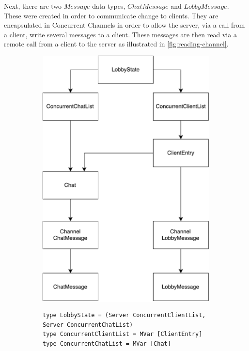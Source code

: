 \documentclass[a4paper]{article}
\begin{document}
Next, there are two $Message$ data types, $ChatMessage$ and $LobbyMessage$. These were created in order to communicate change to clients. They are encapsulated in Concurrent Channels in order to allow the server, via a call from a client, write several messages to a client. These messages are then read via a remote call from a client to the server as illustrated in \cref{fig:reading-channel}.

\begin{figure}[ht!]
    \centering
    \begin{subfigure}{\textwidth}
        \centering
        \includegraphics[scale=0.4]{figure/datatypes}
    
    \end{subfigure}
    \begin{subfigure}{\textwidth}
        \begin{lstlisting}
type LobbyState = (Server ConcurrentClientList, Server ConcurrentChatList)
type ConcurrentClientList = MVar [ClientEntry]
type ConcurrentChatList = MVar [Chat]


\end{lstlisting}
\end{subfigure}
\end{figure}
\end{document}
